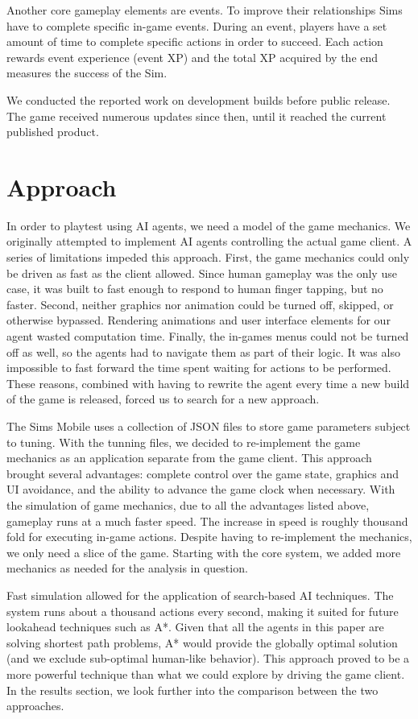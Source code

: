 \documentclass[letterpaper]{article} %
\begin{document}
Another core gameplay elements are events. To improve their relationships Sims have to complete specific in-game events. During an event, players have a set amount of time to complete specific actions in order to succeed. Each action rewards event experience (event XP) and the total XP acquired by the end measures the success of the Sim.


We conducted the reported work on development builds before public release.  The game received numerous updates since then, until it reached the current published product.

\section{Approach}

In order to playtest using AI agents, we need a model of the game mechanics. We originally attempted to implement AI agents controlling the actual game client. A series of limitations impeded this approach. First, the game mechanics could only be driven as fast as the client allowed. Since human gameplay was the only use case, it was built to fast enough to respond to human finger tapping, but no faster.  Second, neither graphics nor animation could be turned off, skipped, or otherwise bypassed. Rendering animations and user interface elements for our agent wasted computation time. Finally, the in-games menus could not be turned off as well, so the agents had to navigate them as part of their logic. It was also impossible to fast forward the time spent waiting for actions to be performed. These reasons, combined with having to rewrite the agent every time a new build of the game is released, forced us to search for a new approach.

The Sims Mobile uses a collection of JSON files to store game parameters subject to tuning.
With the tunning files, we decided to re-implement the game mechanics as an application separate from the game client. This approach brought several advantages: complete control over the game state, graphics and UI avoidance, and the ability to advance the game clock when necessary. With the simulation of game mechanics, due to all the advantages listed above, gameplay runs at a much faster speed. The increase in speed is roughly thousand fold for  executing in-game actions. Despite having to re-implement the mechanics, we only need a slice of the game. Starting with the core system, we added more mechanics as needed for the analysis in question.

Fast simulation allowed for the application of search-based AI techniques. The system runs about a thousand actions every second, making it suited for future lookahead techniques such as A*. Given that all the agents in this paper are solving shortest path problems, A* would provide the globally optimal solution (and we exclude sub-optimal human-like behavior). This approach proved to be a more powerful technique than what we could explore by driving the game client. In the results section, we look further into the comparison between the two approaches.
\end{document}
